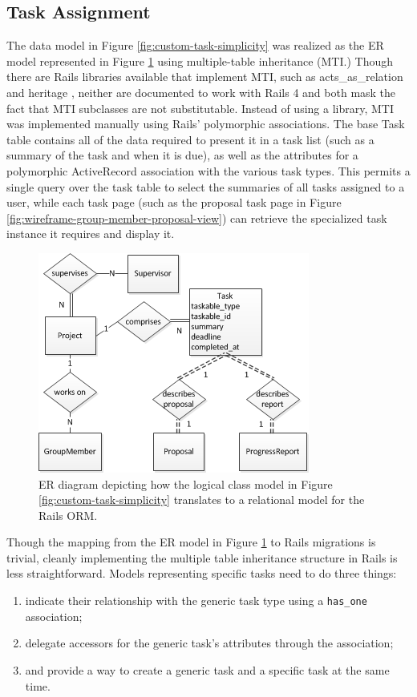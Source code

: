 \documentclass[document.tex]{subfiles}
\begin{document}
\FloatBarrier


\subsection{Task Assignment}
The data model in Figure \ref{fig:custom-task-simplicity} was realized as the ER model represented in Figure \ref{fig:custom-task-er-model} using multiple-table inheritance (MTI.) Though there are Rails libraries available that implement MTI, such as acts\_as\_relation \cite{acts_as_relation} and heritage \cite{heritage}, neither are documented to work with Rails 4 and both mask the fact that MTI subclasses are not substitutable. Instead of using a library, MTI was implemented manually using Rails’ polymorphic associations. The base Task table contains all of the data required to present it in a task list (such as a summary of the task and when it is due), as well as the attributes for a polymorphic ActiveRecord association with the various task types. This permits a single query over the task table to select the summaries of all tasks assigned to a user, while each task page (such as the proposal task page in Figure \ref{fig:wireframe-group-member-proposal-view}) can retrieve the specialized task instance it requires and display it.

\begin{figure}[!htbp]
\centering \includegraphics{./img/case-study-fourth-year-system/task-through-project-er-model}
\caption{ER diagram depicting how the logical class model in Figure \ref{fig:custom-task-simplicity} translates to a relational model for the Rails ORM.}
\label{fig:custom-task-er-model}
\end{figure}

Though the mapping from the ER model in Figure \ref{fig:custom-task-er-model} to Rails migrations is trivial, cleanly implementing the multiple table inheritance structure in Rails is less straightforward. Models representing specific tasks need to do three things:
\begin{enumerate}
  \item indicate their relationship with the generic task type using a \verb!has_one! association;
  \item delegate accessors for the generic task’s attributes through the association;
  \item and provide a way to create a generic task and a specific task at the same time.
\end{enumerate}
\end{document}

